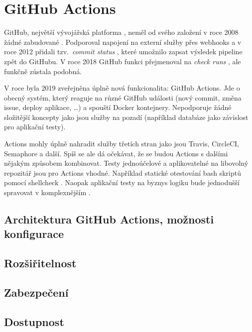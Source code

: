 \section{GitHub Actions}
    GitHub, největší vývojářská platforma \cite{github-about}, neměl od svého založení v roce 2008 žádné zabudované \CI. Podporoval napojení na externí služby přes webhooks a v roce 2012 přidali tzv.~\textit{commit status }, které umožnilo \CI zapsat výsledek pipeline zpět do GitHubu. V roce 2018 GitHub funkci přejmenoval na \textit{check runs }, ale funkčně zůstala podobná.

    V roce byla 2019 zveřejněna úplně nová funkcionalita: GitHub Actions. Jde o obecný systém, který reaguje na různé GitHub události (nový commit, změna issue, deploy aplikace, \ldots) a spouští Docker kontejnery. Nepodporuje žádné složitější koncepty jako jsou služby na pozadí (například databáze jako závislost pro aplikační testy).

    Actions mohly úplně nahradit služby třetích stran jako jsou Travis, CircleCI, Semaphore a další. Spíš se ale dá očekávat, že se budou Actions s dalšími \CI nějakým způsobem kombinovat. Testy jednoúčelové a aplikovatelné na libovolný repozitář jsou pro Actions vhodné. Například statické otestování bash skriptů pomocí shellcheck \cite{ga-shellcheck}. Naopak aplikační testy na byznys logiku bude jednodušší spravovat v komplexnějším \CI.

    \subsection{Architektura GitHub Actions, možnosti konfigurace}
        \blind[2]

    \subsection{Rozšiřitelnost}
        \blind[1]

    \subsection{Zabezpečení}
        \blind[1]

    \subsection{Dostupnost}
        \blind[1]

